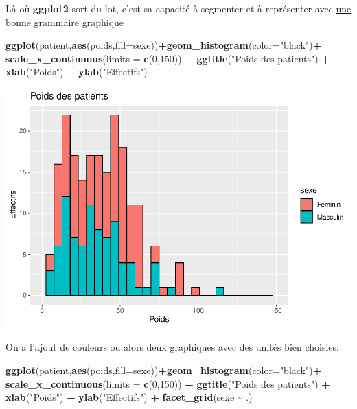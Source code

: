 \documentclass[
]{book}
\newenvironment{Shaded}{\begin{snugshade}}{\end{snugshade}}
\newcommand{\AttributeTok}[1]{\textcolor[rgb]{0.13,0.29,0.53}{#1}}
\newcommand{\DecValTok}[1]{\textcolor[rgb]{0.00,0.00,0.81}{#1}}
\newcommand{\FunctionTok}[1]{\textcolor[rgb]{0.13,0.29,0.53}{\textbf{#1}}}
\newcommand{\NormalTok}[1]{#1}
\newcommand{\SpecialCharTok}[1]{\textcolor[rgb]{0.81,0.36,0.00}{\textbf{#1}}}
\newcommand{\StringTok}[1]{\textcolor[rgb]{0.31,0.60,0.02}{#1}}
\begin{document}
Là où \textbf{ggplot2} sort du lot, c'est sa capacité à segmenter et à représenter
avec \href{https://link.springer.com/book/10.1007/0-387-28695-0}{une bonne grammaire graphique}

\begin{Shaded}
\begin{Highlighting}[]
\FunctionTok{ggplot}\NormalTok{(patient,}\FunctionTok{aes}\NormalTok{(poids,}\AttributeTok{fill=}\NormalTok{sexe))}\SpecialCharTok{+}\FunctionTok{geom\_histogram}\NormalTok{(}\AttributeTok{color=}\StringTok{"black"}\NormalTok{)}\SpecialCharTok{+}
  \FunctionTok{scale\_x\_continuous}\NormalTok{(}\AttributeTok{limits =} \FunctionTok{c}\NormalTok{(}\DecValTok{0}\NormalTok{,}\DecValTok{150}\NormalTok{)) }\SpecialCharTok{+} 
  \FunctionTok{ggtitle}\NormalTok{(}\StringTok{"Poids des patients"}\NormalTok{) }\SpecialCharTok{+} 
  \FunctionTok{xlab}\NormalTok{(}\StringTok{"Poids"}\NormalTok{) }\SpecialCharTok{+} 
  \FunctionTok{ylab}\NormalTok{(}\StringTok{"Effectifs"}\NormalTok{)}
\end{Highlighting}
\end{Shaded}

\includegraphics{_main_files/figure-latex/ggplot8-1.pdf}

On a l'ajout de couleurs ou alors deux graphiques avec des unités bien choisies:

\begin{Shaded}
\begin{Highlighting}[]
\FunctionTok{ggplot}\NormalTok{(patient,}\FunctionTok{aes}\NormalTok{(poids,}\AttributeTok{fill=}\NormalTok{sexe))}\SpecialCharTok{+}\FunctionTok{geom\_histogram}\NormalTok{(}\AttributeTok{color=}\StringTok{"black"}\NormalTok{)}\SpecialCharTok{+}
  \FunctionTok{scale\_x\_continuous}\NormalTok{(}\AttributeTok{limits =} \FunctionTok{c}\NormalTok{(}\DecValTok{0}\NormalTok{,}\DecValTok{150}\NormalTok{)) }\SpecialCharTok{+} 
  \FunctionTok{ggtitle}\NormalTok{(}\StringTok{"Poids des patients"}\NormalTok{) }\SpecialCharTok{+} 
  \FunctionTok{xlab}\NormalTok{(}\StringTok{"Poids"}\NormalTok{) }\SpecialCharTok{+} 
  \FunctionTok{ylab}\NormalTok{(}\StringTok{"Effectifs"}\NormalTok{) }\SpecialCharTok{+}
  \FunctionTok{facet\_grid}\NormalTok{(sexe }\SpecialCharTok{\textasciitilde{}}\NormalTok{ .)}
\end{Highlighting}
\end{Shaded}
\end{document}
